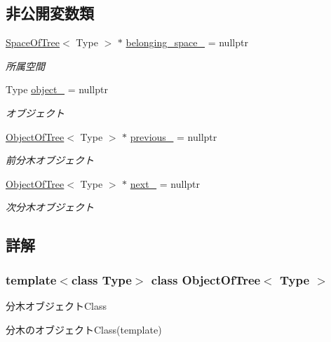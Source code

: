 \subsection*{非公開変数類}
\begin{DoxyCompactItemize}
\item 
\mbox{\hyperlink{class_space_of_tree}{Space\+Of\+Tree}}$<$ Type $>$ $\ast$ \mbox{\hyperlink{class_object_of_tree_a4f0673854adc10539b4b99558ea3b696}{belonging\+\_\+space\+\_\+}} = nullptr
\begin{DoxyCompactList}\small\item\em 所属空間 \end{DoxyCompactList}\item 
Type \mbox{\hyperlink{class_object_of_tree_ad3ce36879f78ba2c2171385a8428c7ba}{object\+\_\+}} = nullptr
\begin{DoxyCompactList}\small\item\em オブジェクト \end{DoxyCompactList}\item 
\mbox{\hyperlink{class_object_of_tree}{Object\+Of\+Tree}}$<$ Type $>$ $\ast$ \mbox{\hyperlink{class_object_of_tree_ac219b6d840381214e54bb248ac1c2693}{previous\+\_\+}} = nullptr
\begin{DoxyCompactList}\small\item\em 前分木オブジェクト \end{DoxyCompactList}\item 
\mbox{\hyperlink{class_object_of_tree}{Object\+Of\+Tree}}$<$ Type $>$ $\ast$ \mbox{\hyperlink{class_object_of_tree_af76d6e92ce202ad91b48896a6a5af95f}{next\+\_\+}} = nullptr
\begin{DoxyCompactList}\small\item\em 次分木オブジェクト \end{DoxyCompactList}\end{DoxyCompactItemize}


\subsection{詳解}
\subsubsection*{template$<$class Type$>$\newline
class Object\+Of\+Tree$<$ Type $>$}

分木オブジェクト\+Class 

分木のオブジェクト\+Class(template) 

